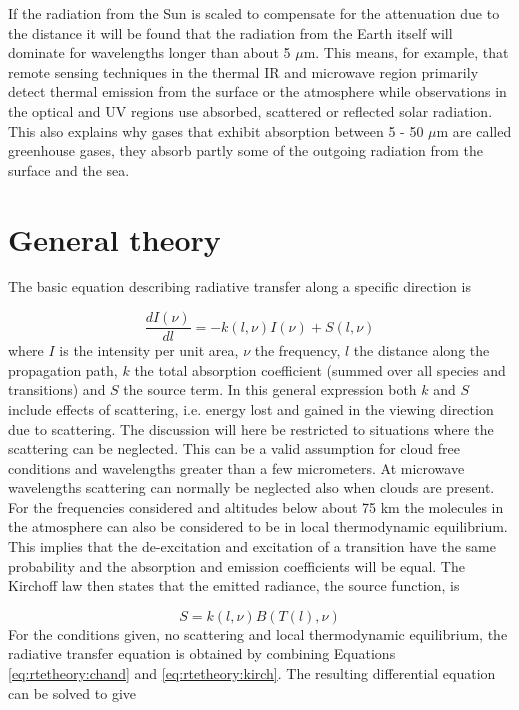  If the radiation from the Sun is scaled to compensate for the
 attenuation due to the distance it will be found that the radiation
 from the Earth itself will dominate for wavelengths longer than about
 5 $\mu$m. This means, for example, that remote sensing techniques in
 the thermal IR and microwave region primarily detect thermal emission
 from the surface or the atmosphere while observations in the optical
 and UV regions use absorbed, scattered or reflected solar radiation.
 This also explains why gases that exhibit absorption between 5 - 50
 $\mu$m are called greenhouse gases, they absorb partly some of the
 outgoing radiation from the surface and the sea.


\section{General theory}
 \label{sec:rtetheory:gen_theory}

 The basic equation describing radiative transfer along a specific 
 direction is

 \begin{equation}
   \frac{dI(\nu)}{dl} = -k(l,\nu)I(\nu) + S(l,\nu)
  \label{eq:rtetheory:chand}
 \end{equation} 
 where $I$ is the intensity per unit area, $\nu$ the frequency, $l$
 the distance along the propagation path, $k$ the total absorption
 coefficient (summed over all species and transitions) and $S$ the
 source term. In this general expression both $k$ and $S$ include
 effects of scattering, i.e. energy lost and gained in the viewing
 direction due to scattering. The discussion will here be restricted
 to situations where the scattering can be neglected. This can be a
 valid assumption for cloud free conditions and wavelengths greater
 than a few micrometers. At microwave wavelengths scattering can
 normally be neglected also when clouds are present. For the
 frequencies considered and altitudes below about 75 km the molecules
 in the atmosphere can also be considered to be in local thermodynamic
 equilibrium. This implies that the de-excitation and excitation of a
 transition have the same probability and the absorption and emission
 coefficients will be equal.  The Kirchoff law then states that the
 emitted radiance, the source function, is

 \begin{equation}
   S = k(l,\nu)B(T(l),\nu)
  \label{eq:rtetheory:kirch}
 \end{equation}  
 For the conditions given, no scattering and local thermodynamic
 equilibrium, the radiative transfer equation is obtained by combining
 Equations \ref{eq:rtetheory:chand} and \ref{eq:rtetheory:kirch}. The resulting
 differential equation can be solved to give

